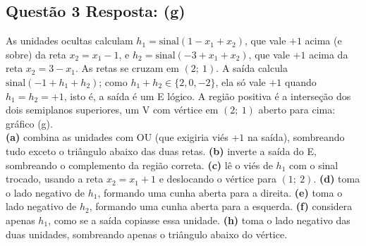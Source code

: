 \documentclass[11pt,a4paper]{article}
\begin{document}
\subsection*{Questão 3 \textemdash{} Resposta: (g)}
As unidades ocultas calculam $h_1 = \mathrm{sinal}(1 - x_1 + x_2)$, que vale $+1$ acima (e sobre) da reta $x_2 = x_1 - 1$, e $h_2 = \mathrm{sinal}(-3 + x_1 + x_2)$, que vale $+1$ acima da reta $x_2 = 3 - x_1$. As retas se cruzam em $(2;\ 1)$. A saída calcula $\mathrm{sinal}(-1 + h_1 + h_2)$; como $h_1 + h_2 \in \{2, 0, -2\}$, ela só vale $+1$ quando $h_1 = h_2 = +1$, isto é, a saída é um E lógico. A região positiva é a interseção dos dois semiplanos superiores, um V com vértice em $(2;\ 1)$ aberto para cima: gráfico (g).\\
\textbf{(a)} combina as unidades com OU (que exigiria viés $+1$ na saída), sombreando tudo exceto o triângulo abaixo das duas retas.
\textbf{(b)} inverte a saída do E, sombreando o complemento da região correta.
\textbf{(c)} lê o viés de $h_1$ com o sinal trocado, usando a reta $x_2 = x_1 + 1$ e deslocando o vértice para $(1;\ 2)$.
\textbf{(d)} toma o lado negativo de $h_1$, formando uma cunha aberta para a direita.
\textbf{(e)} toma o lado negativo de $h_2$, formando uma cunha aberta para a esquerda.
\textbf{(f)} considera apenas $h_1$, como se a saída copiasse essa unidade.
\textbf{(h)} toma o lado negativo das duas unidades, sombreando apenas o triângulo abaixo do vértice.
\end{document}
